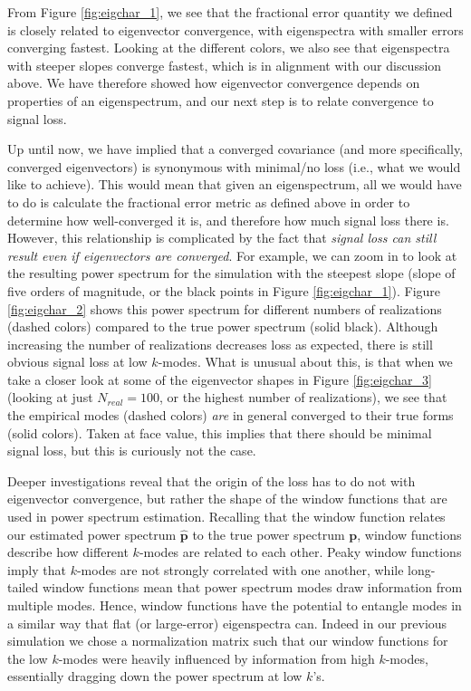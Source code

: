From Figure \ref{fig:eigchar_1}, we see that the fractional error quantity we defined is closely related to eigenvector convergence, with eigenspectra with smaller errors converging fastest. Looking at the different colors, we also see that eigenspectra with steeper slopes converge fastest, which is in alignment with our discussion above. We have therefore showed how eigenvector convergence depends on properties of an eigenspectrum, and our next step is to relate convergence to signal loss. 

Up until now, we have implied that a converged covariance (and more specifically, converged eigenvectors) is synonymous with minimal/no loss (i.e., what we would like to achieve). This would mean that given an eigenspectrum, all we would have to do is calculate the fractional error metric as defined above in order to determine how well-converged it is, and therefore how much signal loss there is. However, this relationship is complicated by the fact that \textit{signal loss can still result even if eigenvectors are converged}. For example, we can zoom in to look at the resulting power spectrum for the simulation with the steepest slope (slope of five orders of magnitude, or the black points in Figure \ref{fig:eigchar_1}). Figure \ref{fig:eigchar_2} shows this power spectrum for different numbers of realizations (dashed colors) compared to the true power spectrum (solid black). Although increasing the number of realizations decreases loss as expected, there is still obvious signal loss at low $k$-modes. What is unusual about this, is that when we take a closer look at some of the eigenvector shapes in Figure \ref{fig:eigchar_3} (looking at just $N_{real}=100$, or the highest number of realizations), we see that the empirical modes (dashed colors) \textit{are} in general converged to their true forms (solid colors). Taken at face value, this implies that there should be minimal signal loss, but this is curiously not the case.

Deeper investigations reveal that the origin of the loss has to do not with eigenvector convergence, but rather the shape of the window functions that are used in power spectrum estimation. Recalling that the window function relates our estimated power spectrum $\widehat{\textbf{p}}$ to the true power spectrum $\textbf{p}$, window functions describe how different $k$-modes are related to each other. Peaky window functions imply that $k$-modes are not strongly correlated with one another, while long-tailed window functions mean that power spectrum modes draw information from multiple modes. Hence, window functions have the potential to entangle modes in a similar way that flat (or large-error) eigenspectra can. Indeed in our previous simulation we chose a normalization matrix such that our window functions for the low $k$-modes were heavily influenced by information from high $k$-modes, essentially dragging down the power spectrum at low $k$'s.

